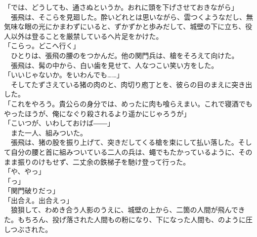 \documentclass[
  paper=a5,
  fontsize=10pt,
  jafontsize=9.5pt,
  tate,                  %
  open_bracket_pos=nibu, %
]{jlreq}
\begin{document}
「では、どうしても、通さぬというか。おれに頭を下げさせておきながら」\\


　張飛は、そこらを見廻した。酔いどれとは思いながら、雲つくようなだし、無気味な眼の光にかまわずにいると、ずかずかと歩みだして、城壁の下に立ち、役人以外は登ることを厳禁しているへ片足をかけた。\\


「こらっ。どこへ行く」\\


　ひとりは、張飛の腰のをつかんだ。他の関門兵は、槍をそろえて向けた。\\


　張飛は、髯の中から、白い歯を見せて、人なつこい笑い方をした。\\


「いいじゃないか。をいわんでも……」\\


　そしてたずさえている猪の肉のと、肉切り庖丁とを、彼らの目のまえに突き出した。\\


「これをやろう。貴公らの身分では、めったに肉も喰らえまい。これで寝酒でもやったほうが、俺になぐり殺されるより遥かにじゃろうが」\\


「こいつが、いわしておけば――」\\


　また一人、組みついた。\\


　張飛は、猪の股を振り上げて、突きだしてくる槍を束にして払い落した。そして自分の腰と首に組みついている二人の兵は、蠅でもたかっているように、そのまま振りのけもせず、二丈余の鉄梯子を馳け登って行った。\\


「や、やっ」\\


「っ」\\


「関門破りだっ」\\


「出合え。出合えっ」\\


　狼狽して、わめき合う人影のうえに、城壁の上から、二箇の人間が飛んできた。もちろん、投げ落された人間もの粉になり、下になった人間も、のように圧しつぶされた。\\
\end{document}
